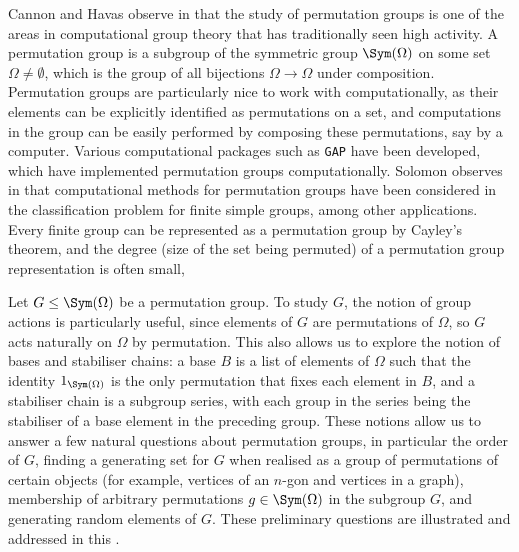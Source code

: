 Cannon and Havas observe in \cite{cannon_havas1992} that the study of permutation groups is one of the areas in computational group theory that has traditionally seen high activity. A permutation group is a subgroup of the symmetric group $\Sym(\Omega)$ on some set $\Omega \neq \emptyset$, which is the group of all bijections $\Omega \to \Omega$ under composition. Permutation groups are particularly nice to work with computationally, as their elements can be explicitly identified as permutations on a set, and computations in the group can be easily performed by composing these permutations, say by a computer. Various computational packages such as \texttt{GAP} have been developed, which have implemented permutation groups computationally. Solomon observes in \cite{solomon2001} that computational methods for permutation groups have been considered in the classification problem for finite simple groups, among other applications. Every finite group can be represented as a permutation group by Cayley's theorem, and the degree (size of the set being permuted) of a permutation group representation is often small, 

Let $G \leq \Sym(\Omega)$ be a permutation group. To study $G$, the notion of group actions is particularly useful, since elements of $G$ are permutations of $\Omega$, so $G$ acts naturally on $\Omega$ by permutation. This also allows us to explore the notion of bases and stabiliser chains: a base $B$ is a list of elements of $\Omega$ such that the identity $1_{\Sym(\Omega)}$ is the only permutation that fixes each element in $B$, and a stabiliser chain  is a subgroup series, with each group in the series being the stabiliser of a base element in the preceding group.  These notions allow us to answer a few natural questions about permutation groups, in particular  the order of $G$, finding a generating set for $G$ when realised as a group of permutations of certain objects (for example, vertices of an $n$-gon and vertices in a graph),  membership of arbitrary permutations $g \in \Sym(\Omega)$ in the subgroup $G$, and generating random elements of $G$. These preliminary questions are illustrated and addressed in this \thesis{}.

